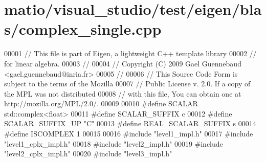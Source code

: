 \hypertarget{matio_2visual__studio_2test_2eigen_2blas_2complex__single_8cpp_source}{}\section{matio/visual\+\_\+studio/test/eigen/blas/complex\+\_\+single.cpp}
\label{matio_2visual__studio_2test_2eigen_2blas_2complex__single_8cpp_source}

\begin{DoxyCode}
00001 \textcolor{comment}{// This file is part of Eigen, a lightweight C++ template library}
00002 \textcolor{comment}{// for linear algebra.}
00003 \textcolor{comment}{//}
00004 \textcolor{comment}{// Copyright (C) 2009 Gael Guennebaud <gael.guennebaud@inria.fr>}
00005 \textcolor{comment}{//}
00006 \textcolor{comment}{// This Source Code Form is subject to the terms of the Mozilla}
00007 \textcolor{comment}{// Public License v. 2.0. If a copy of the MPL was not distributed}
00008 \textcolor{comment}{// with this file, You can obtain one at http://mozilla.org/MPL/2.0/.}
00009 
00010 \textcolor{preprocessor}{#define SCALAR        std::complex<float>}
00011 \textcolor{preprocessor}{#define SCALAR\_SUFFIX c}
00012 \textcolor{preprocessor}{#define SCALAR\_SUFFIX\_UP "C"}
00013 \textcolor{preprocessor}{#define REAL\_SCALAR\_SUFFIX s}
00014 \textcolor{preprocessor}{#define ISCOMPLEX     1}
00015 
00016 \textcolor{preprocessor}{#include "level1\_impl.h"}
00017 \textcolor{preprocessor}{#include "level1\_cplx\_impl.h"}
00018 \textcolor{preprocessor}{#include "level2\_impl.h"}
00019 \textcolor{preprocessor}{#include "level2\_cplx\_impl.h"}
00020 \textcolor{preprocessor}{#include "level3\_impl.h"}
\end{DoxyCode}
